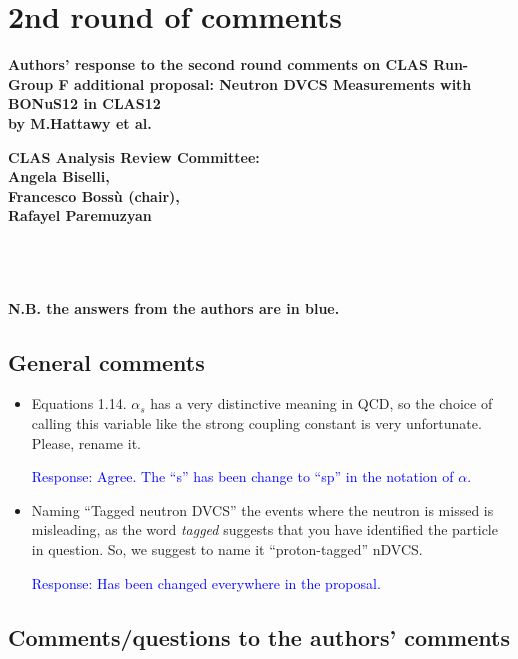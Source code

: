 \chapter{2nd round of comments}
{\bf Authors' response to the second round comments on CLAS Run-Group F 
additional proposal: Neutron DVCS Measurements with BONuS12 in CLAS12 \\ by 
M.Hattawy et al.}
\author{Angela Biselli, Francesco Boss\`u (chair), Rafayel Paremuzyan\\CLAS 
Analysis Review Committee}

{\center \bf CLAS Analysis Review Committee:\\Angela Biselli,\\ Francesco 
Boss\`u (chair),\\ Rafayel Paremuzyan\\}


\def \rarr {\ensuremath{\rightarrow}}
~\\
~\\
~\\

{\bf N.B. the answers from the authors are in blue.} \\ 
 
 \section*{General comments}
 \begin{itemize}
  \item Equations 1.14. $\alpha_s$ has a very distinctive meaning in QCD, so 
     the choice of calling this variable like the strong coupling constant is 
       very unfortunate. Please, rename it.
  
  \textcolor{blue}{Response: Agree. The ``s'' has been change to ``sp'' in the 
       notation of $\alpha$. }


\item Naming ``Tagged neutron DVCS'' the events where the neutron is missed is 
   misleading, as the word \textit{tagged} suggests that you have identified 
       the particle in question. So, we suggest to name it ``proton-tagged'' 
       nDVCS.

 
  \textcolor{blue}{Response: Has been changed everywhere in the proposal.}
 
 \end{itemize}

 
 
 \section*{Comments/questions to  the authors' comments}
 
